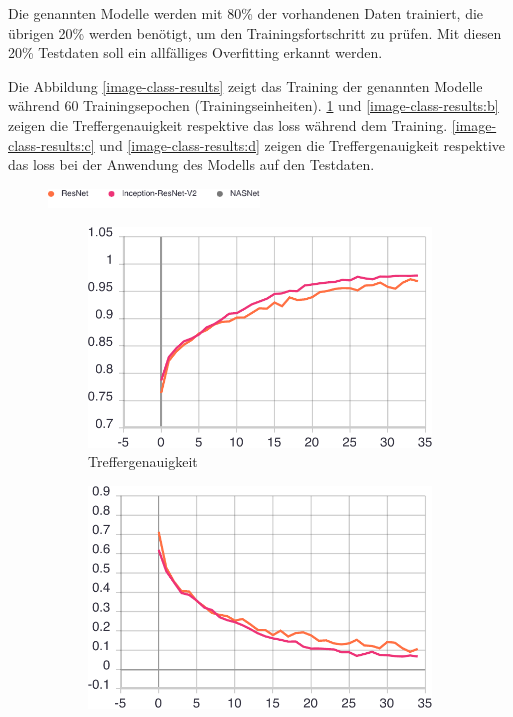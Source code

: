 Die genannten Modelle werden mit 80\% der vorhandenen Daten trainiert, die übrigen 20\% werden benötigt, um den Trainingsfortschritt zu prüfen. Mit diesen 20\% Testdaten soll ein allfälliges Overfitting erkannt werden.

Die Abbildung \ref{image-class-results} zeigt das Training der genannten Modelle während 60 Trainingsepochen (Trainingseinheiten). \ref{image-class-results:a} und \ref{image-class-results:b} zeigen die Treffergenauigkeit respektive das loss während dem Training.  \ref{image-class-results:c} und \ref{image-class-results:d} zeigen die Treffergenauigkeit respektive das loss bei der Anwendung des Modells auf den Testdaten. 

\begin{figure}[h!] 
  \captionsetup{width=.9\linewidth}
  \caption[Statistiken aus dem Training der Bild-basierten Klassifizierung von Rechnungen]{Statistiken aus dem Training der Bild-basierten Klassifizierung von Rechnungen mit den ResNet, Inception-ResNetV2 und NASNet Netzwerken.}
  \label{image-class-results} 
  \includegraphics[width=0.5\textwidth]{graphics/image-classification-results/legend.pdf}
  \begin{subfigure}[b]{0.5\linewidth}
    \centering
    \includegraphics[width=0.75\linewidth]{graphics/image-classification-results/acc.pdf} 
    \caption{Treffergenauigkeit} 
    \label{image-class-results:a} 
    \vspace{2ex}
  \end{subfigure}%
  \begin{subfigure}[b]{0.5\linewidth}
    \centering
    \includegraphics[width=0.75\linewidth]{graphics/image-classification-results/loss.pdf} 

\end{subfigure}
\end{figure}
